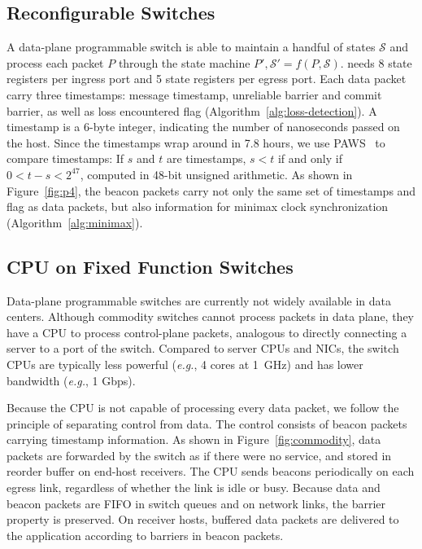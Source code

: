 \subsection{Reconfigurable Switches}
\label{sec:p4}

A data-plane programmable switch is able to maintain a handful of states $\mathcal{S}$ and process each packet $P$ through the state machine $P', \mathcal{S}' = f(P, \mathcal{S})$.
\sys needs 8 state registers per ingress port and 5 state registers per egress port.
Each data packet carry three timestamps: message timestamp, unreliable barrier and commit barrier, as well as loss encountered flag (Algorithm~\ref{alg:loss-detection}).
A timestamp is a 6-byte integer, indicating the number of nanoseconds passed on the host.
Since the timestamps wrap around in 7.8 hours, we use PAWS~\cite{jacobson1992tcp} to compare timestamps: If $s$ and $t$ are timestamps, $s < t$ if and only if $0 < t - s < 2^{47}$, computed in 48-bit unsigned arithmetic.
As shown in Figure~\ref{fig:p4}, the beacon packets carry not only the same set of timestamps and flag as data packets, but also information for minimax clock synchronization (Algorithm~\ref{alg:minimax}).

\subsection{CPU on Fixed Function Switches}
\label{sec:commodity}

Data-plane programmable switches are currently not widely available in data centers.
Although commodity switches cannot process packets in data plane, they have a CPU to process control-plane packets, analogous to directly connecting a server to a port of the switch.
Compared to server CPUs and NICs, the switch CPUs are typically less powerful (\textit{e.g.}, 4 cores at 1~GHz) and has lower bandwidth (\textit{e.g.}, 1 Gbps).

Because the CPU is not capable of processing every data packet, we follow the principle of separating control from data.
The control consists of beacon packets carrying timestamp information.
As shown in Figure~\ref{fig:commodity}, data packets are forwarded by the switch as if there were no \sys service, and stored in reorder buffer on end-host receivers.
The CPU sends beacons periodically on each egress link, regardless of whether the link is idle or busy.
Because data and beacon packets are FIFO in switch queues and on network links, the barrier property is preserved.
On receiver hosts, buffered data packets are delivered to the application according to barriers in beacon packets.

